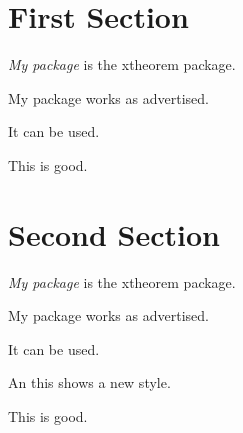 \documentclass{article}
\begin{document}
\section{First Section}

\begin{Def}
\emph{My package} is the \textsf{xtheorem} package.
\end{Def}
\begin{Thm}
My package works as advertised.
\end{Thm}
\begin{Cor}[Achim]
It can be used.
\end{Cor}
\begin{Rem}
This is good.
\end{Rem}

\section{Second Section}

\begin{Def}
\emph{My package} is the \textsf{xtheorem} package.
\end{Def}
\begin{Thm}
My package works as advertised.
\end{Thm}
\begin{Cor}[Achim]
It can be used.
\end{Cor}
\begin{Exam}[Frank]
An this shows a new style.
\end{Exam}
\begin{Rem}
This is good.
\end{Rem}

\stop
\end{document}
